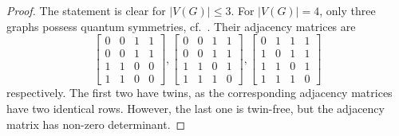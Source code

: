 \documentclass[11pt,reqno]{amsart}
\begin{document}
\begin{proof}
The statement is clear for $|V(G)|\leq 3$. For $|V(G)|=4$, only three graphs possess quantum symmetries, cf.~\cite{Weber22}. Their adjacency matrices are
\[
\begin{bmatrix}
0&0&1&1\\
0&0&1&1\\
1&1&0&0\\
1&1&0&0
\end{bmatrix},
\begin{bmatrix}
0&0&1&1\\
0&0&1&1\\
1&1&0&1\\
1&1&1&0
\end{bmatrix},
\begin{bmatrix}
0&1&1&1\\
1&0&1&1\\
1&1&0&1\\
1&1&1&0
\end{bmatrix}
\]
respectively. The first two have twins, as the corresponding adjacency matrices have two identical rows. However, the last one is twin-free, but the adjacency matrix has non-zero determinant. 


\end{proof}
\end{document}
